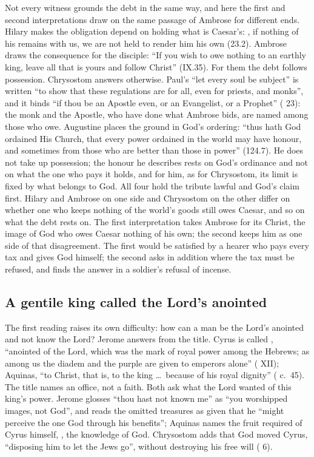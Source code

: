 Not every witness grounds the debt in the same way, and here the first and
second interpretations draw on the same passage of Ambrose for different ends.
Hilary makes the obligation depend on holding what is Caesar's: , if nothing of his remains with us, we are not held to render him
his own (23.2). Ambrose draws the consequence for the disciple: ``If you wish to
owe nothing to an earthly king, leave all that is yours and follow Christ''
(IX.35). For them the debt follows possession. Chrysostom answers otherwise.
Paul's ``let every soul be subject'' is written ``to show that these
regulations are for all, even for priests, and monks'', and it binds ``if thou
be an Apostle even, or an Evangelist, or a Prophet'' ( 23): the monk and the Apostle, who have done what Ambrose bids, are
named among those who owe. Augustine places the ground in God's ordering:
``thus hath God ordained His Church, that every power ordained in the world may
have honour, and sometimes from those who are better than those in power''
(124.7). He does not take up possession; the honour he describes rests on
God's ordinance and not on what the one who pays it holds, and for him, as for
Chrysostom, its limit is fixed by what belongs to God. All four hold the
tribute lawful and God's claim first. Hilary and Ambrose on one side and
Chrysostom on the other differ on whether one who keeps nothing of the world's
goods still owes Caesar, and so on what the debt rests on. The first
interpretation takes Ambrose for its Christ, the image of God who
owes Caesar nothing of his own; the second keeps him as one side of that
disagreement. The first would be satisfied by a hearer who pays every tax and gives God himself;
the second asks in addition where the tax must be refused, and finds the answer
in a soldier's refusal of incense.

\subsection{A gentile king called the Lord's anointed}

The first reading raises its own difficulty: how can a man be the Lord's
anointed and not know the Lord? Jerome answers from the title. Cyrus is called
, ``anointed of the Lord, which was the mark of royal power
among the Hebrews; as among us the diadem and the purple are given to emperors
alone'' ( XII); Aquinas, ``to Christ, that is, to
the king \ldots\ because of his royal dignity'' ( c.~45).
The title names an office, not a faith. Both ask what the Lord wanted of this
king's power. Jerome glosses ``thou hast not known me'' as ``you worshipped
images, not God'', and reads the omitted treasures as given that he ``might
perceive the one God through his benefits''; Aquinas names the fruit required
of Cyrus himself, , the knowledge of God. Chrysostom
adds that God moved Cyrus, ``disposing him to let the Jews go'', without
destroying his free will ( 6).


